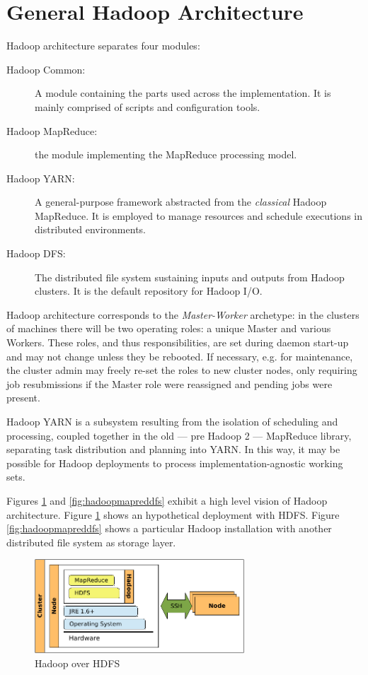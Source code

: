 \section{General Hadoop Architecture}\label{sec:arquitecturahadoop}
\noindent Hadoop architecture separates four modules:
\begin{description}
 \item[Hadoop Common:] A module containing the parts used across the implementation. It is mainly comprised of scripts and configuration tools.
 \item[Hadoop MapReduce:] the module implementing the MapReduce processing model.
 \item[Hadoop YARN:] A general-purpose framework abstracted from the \emph{classical} Hadoop MapReduce. It is employed to manage resources and schedule executions in distributed environments.
 \item[Hadoop DFS:] The distributed file system sustaining inputs and outputs from Hadoop clusters. It is the default repository for Hadoop I/O.
\end{description}

Hadoop architecture corresponds to the \emph{Master-Worker} archetype: in the clusters of machines there will be two operating roles: a unique Master and various Workers. These roles, and thus responsibilities, are set during daemon start-up and may not change unless they be rebooted. If necessary, e.g. for maintenance, the cluster admin may freely re-set the roles to new cluster nodes, only requiring job resubmissions if the Master role were reassigned and pending jobs were present.

Hadoop YARN is a subsystem resulting from the isolation of scheduling and processing, coupled together in the old --- pre Hadoop 2 --- MapReduce library, separating task distribution and planning into YARN. In this way, it may be possible for Hadoop deployments to process implementation-agnostic working sets.

Figures \ref{fig:hadoopmapredhdfs} and \ref{fig:hadoopmapreddfs} exhibit a high level vision of Hadoop architecture. Figure \ref{fig:hadoopmapredhdfs} shows an hypothetical deployment with HDFS. Figure \ref{fig:hadoopmapreddfs} shows a particular Hadoop installation with another distributed file system as storage layer.

\begin{figure}[tbp]
\begin{center}
\includegraphics[width=0.7\textwidth]{imagenes/015.pdf}
 \caption{Hadoop over HDFS}
\label{fig:hadoopmapredhdfs}
\end{center}
\end{figure}

